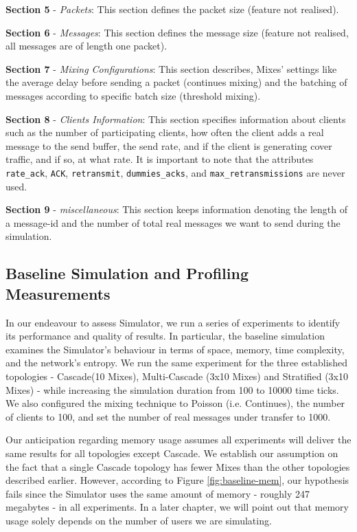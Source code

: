 \documentclass[logo,msc,cyber]{infthesis}   %
\begin{document}
\textbf{Section 5} - \emph{Packets}: This section defines the packet size
(feature not realised).

\textbf{Section 6} - \emph{Messages}: This section defines the message size
(feature not realised, all messages are of length one packet).

\textbf{Section 7} - \emph{Mixing Configurations}: This section describes, Mixes'
settings like the average delay before sending a packet (continues mixing) and
the batching of messages according to specific batch size (threshold mixing). 
    
\textbf{Section 8} - \emph{Clients Information}: This section specifies
information about clients such as the number of participating clients, how
often the client adds a real message to the send buffer, the send rate, and if
the client is generating cover traffic, and if so, at what rate. It is important
to note that the attributes \texttt{rate\_ack}, \texttt{ACK},
\texttt{retransmit}, \texttt{dummies\_acks}, and \texttt{max\_retransmissions}
are never used. 

\textbf{Section 9} - \emph{miscellaneous}: This section keeps information
denoting the length of a message-id and the number of total real messages we
want to send during the simulation.


\subsection{Baseline Simulation and Profiling Measurements}

In our endeavour to assess Simulator, we run a series of experiments to identify
its performance and quality of results. In particular, the baseline simulation
examines the Simulator's behaviour in terms of space, memory, time complexity,
and the network's entropy. We run the same experiment for the three established
topologies - Cascade(10 Mixes), Multi-Cascade (3x10 Mixes) and Stratified (3x10
Mixes) - while increasing the simulation duration from 100 to 10000 time ticks.
We also configured the mixing technique to Poisson (i.e. Continues), the number
of clients to 100, and set the number of real messages under transfer to 1000. 

Our anticipation regarding memory usage assumes all experiments will deliver the
same results for all topologies except Cascade. We establish our assumption on
the fact that a single Cascade topology has fewer Mixes than the other
topologies described earlier. However, according to Figure
\ref{fig:baseline-mem}, our hypothesis fails since the Simulator uses the same
amount of memory - roughly 247 megabytes - in all experiments. In a later
chapter, we will point out that memory usage solely depends on the number of
users we are simulating.
\end{document}
